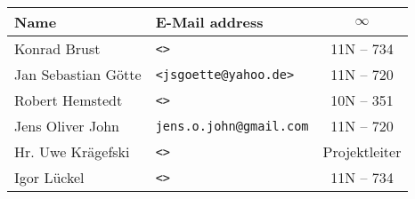 \begin{tabular}{|l|l|c|}
 \bfseries{Name} 	& \bfseries{E-Mail address} 		& \bfseries{$\infty$}	\\
\hline

Konrad Brust 		& \nolinkurl{<>} 			& 11N -- 734 		\\
Jan Sebastian Götte 	& \nolinkurl{<jsgoette@yahoo.de>} 			& 11N -- 720 		\\
Robert Hemstedt 	& \nolinkurl{<>} 			& 10N -- 351 		\\
Jens Oliver John 	& \nolinkurl{jens.o.john@gmail.com} 	& 11N -- 720 		\\
Hr. Uwe Krägefski 	& \nolinkurl{<>} 			& Projektleiter 	\\
Igor Lückel 		& \nolinkurl{<>} 			& 11N -- 734

\end{tabular}

